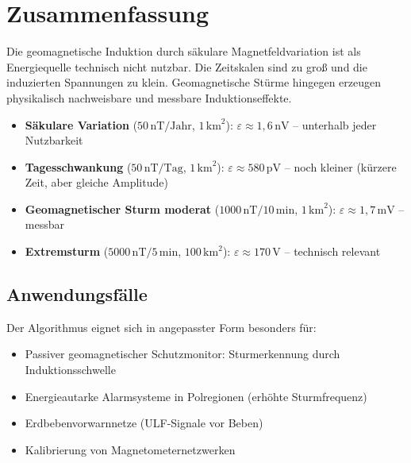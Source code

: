 ﻿\documentclass[a4paper,12pt]{article}
\theoremstyle{definition}
\begin{document}
\section{Zusammenfassung}

Die geomagnetische Induktion durch s\"akulare Magnetfeldvariation ist
als Energiequelle technisch nicht nutzbar. Die Zeitskalen sind zu gro{\ss}
und die induzierten Spannungen zu klein. Geomagnetische St\"urme hingegen
erzeugen physikalisch nachweisbare und messbare Induktionseffekte.

\begin{itemize}
    \item \textbf{S\"akulare Variation} ($50\,\mathrm{nT/Jahr}$, $1\,\mathrm{km}^2$):
          $\varepsilon \approx 1{,}6\,\mathrm{nV}$ -- unterhalb jeder Nutzbarkeit
    \item \textbf{Tagesschwankung} ($50\,\mathrm{nT/Tag}$, $1\,\mathrm{km}^2$):
          $\varepsilon \approx 580\,\mathrm{pV}$ -- noch kleiner (k\"urzere Zeit,
          aber gleiche Amplitude)
    \item \textbf{Geomagnetischer Sturm moderat} ($1000\,\mathrm{nT}/10\,\mathrm{min}$,
          $1\,\mathrm{km}^2$): $\varepsilon \approx 1{,}7\,\mathrm{mV}$ -- messbar
    \item \textbf{Extremsturm} ($5000\,\mathrm{nT}/5\,\mathrm{min}$, $100\,\mathrm{km}^2$):
          $\varepsilon \approx 170\,\mathrm{V}$ -- technisch relevant
\end{itemize}

\subsection{Anwendungsf\"alle}

Der Algorithmus eignet sich in angepasster Form besonders f\"ur:
\begin{itemize}
    \item Passiver geomagnetischer Schutzmonitor: Sturmerkennung durch
          Induktionsschwelle
    \item Energieautarke Alarmsysteme in Polregionen (erh\"ohte Sturmfrequenz)
    \item Erdbebenvorwarnnetze (ULF-Signale vor Beben)
    \item Kalibrierung von Magnetometernetzwerken
\end{itemize}
\end{document}
